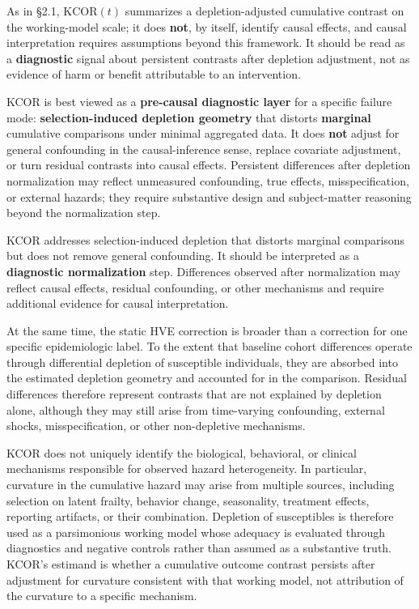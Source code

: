 \documentclass[
]{article}
\begin{document}
As in §2.1, \(\mathrm{KCOR}(t)\) summarizes a depletion-adjusted cumulative contrast on the working-model scale; it does \textbf{not}, by itself, identify causal effects, and causal interpretation requires assumptions beyond this framework. It should be read as a \textbf{diagnostic} signal about persistent contrasts after depletion adjustment, not as evidence of harm or benefit attributable to an intervention.

KCOR is best viewed as a \textbf{pre-causal diagnostic layer} for a specific failure mode: \textbf{selection-induced depletion geometry} that distorts \textbf{marginal} cumulative comparisons under minimal aggregated data. It does \textbf{not} adjust for general confounding in the causal-inference sense, replace covariate adjustment, or turn residual contrasts into causal effects. Persistent differences after depletion normalization may reflect unmeasured confounding, true effects, misspecification, or external hazards; they require substantive design and subject-matter reasoning beyond the normalization step.

KCOR addresses selection-induced depletion that distorts marginal comparisons but does not remove general confounding. It should be interpreted as a \textbf{diagnostic normalization} step. Differences observed after normalization may reflect causal effects, residual confounding, or other mechanisms and require additional evidence for causal interpretation.

At the same time, the static HVE correction is broader than a correction for one specific epidemiologic label. To the extent that baseline cohort differences operate through differential depletion of susceptible individuals, they are absorbed into the estimated depletion geometry and accounted for in the comparison. Residual differences therefore represent contrasts that are not explained by depletion alone, although they may still arise from time-varying confounding, external shocks, misspecification, or other non-depletive mechanisms.

KCOR does not uniquely identify the biological, behavioral, or clinical mechanisms responsible for observed hazard heterogeneity. In particular, curvature in the cumulative hazard may arise from multiple sources, including selection on latent frailty, behavior change, seasonality, treatment effects, reporting artifacts, or their combination. Depletion of susceptibles is therefore used as a parsimonious working model whose adequacy is evaluated through diagnostics and negative controls rather than assumed as a substantive truth. KCOR's estimand is whether a cumulative outcome contrast persists after adjustment for curvature consistent with that working model, not attribution of the curvature to a specific mechanism.
\end{document}
